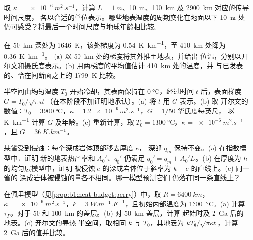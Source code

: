 \begin{exercise}[$\star\star$]\label{exo:b1:heat-budget:7}
取 $\kappa = \qty{e-6}{m^2.s^{-1}}$，计算
$L = \qty{1}{m}$、\qty{10}{m}、\qty{100}{km} 及 \qty{2900}{km} 对应的传导时间尺度，
各以合适的单位表示。哪些地表温度的周期变化在地面以下 \qty{10}{m} 处
仍可感受？将最后一个时间尺度与地球年龄相比较。
\end{exercise}

\begin{exercise}[$\star\star$]\label{exo:b1:heat-budget:8}
在 \qty{50}{km} 深处为 \qty{1646}{K}，该处梯度为
\qty{0.54}{K.km^{-1}}，至 \qty{410}{km} 处降为 \qty{0.36}{K.km^{-1}}。
(a) 以 \qty{50}{km} 处的梯度将其外推至地表，并给出
位温，分别以开尔文和摄氏度表示。(b) 用两梯度的平均值估计
\qty{410}{km} 处的温度，并
与已发表的、恰在间断面之上的 \qty{1799}{K} 比较。
\end{exercise}

\begin{exercise}[$\star\star$]\label{exo:b1:heat-budget:9}
半空间由均匀温度 $T_0$ 开始冷却，其表面保持在
$\qty{0}{\degreeCelsius}$，经过时间 $t$ 后，表面梯度 $G =
T_0/\sqrt{\pi\kappa t}$（在本阶段不加证明地承认）。(a) 将 $t$ 用 $G$ 表示。(b) 取
开尔文的数值：$T_0 = \qty{3900}{\degreeCelsius}$，$\kappa =
\qty{1.2e-6}{m^2.s^{-1}}$，$G = 1/50$ 华氏度每英尺，
以 \unit{K.km^{-1}} 计算 $G$ 及年龄。(c) 重新计算，取 $T_0 =
\qty{1300}{\degreeCelsius}$，$\kappa = \qty{e-6}{m^2.s^{-1}}$，且 $G =
\qty{36}{K.km^{-1}}$。
\end{exercise}

\begin{exercise}[$\star\star\star$]\label{exo:b1:heat-budget:10}
某省受到侵蚀：每个深成岩体顶部移去厚度 $e$，
深部 $q_m$ 保持不变。(a) 在指数模型中，证明
新的地表热产率和 $A_0'$、$q_0'$ 仍满足
$q_0' = q_m + A_0'D$。(b) 在厚度为 $h$ 的均匀层模型中，证明
被侵蚀 $e$ 的深成岩体位于斜率为 $h - e$ 的直线上。(c) 同一省的
深成岩体被侵蚀的量各不相同。哪一模型预测它们
仍落在同一条直线上？
\end{exercise}

\begin{exercise}[$\star\star\star$]\label{exo:b1:heat-budget:11}
在佩里模型（见\cref{prop:b1:heat-budget:perry}）中，取 $R = \qty{6400}{km}$，
$\kappa = \qty{e-6}{m^2.s^{-1}}$，$k = \qty{3}{W.m^{-1}.K^{-1}}$，且初始内部温度为
\qty{1300}{\degreeCelsius}。(a) 计算 $\tau_P$，对于
50 和 \qty{100}{km} 的盖层。(b) 对 \qty{50}{km} 盖层，计算
起始时及 \qty{2}{Ga} 后的地表。(c) 开尔文的导热
半空间，取相同 $k$ 与 $T_0$，其地表为
$kT_0/\sqrt{\pi\kappa t}$，计算 \qty{2}{Ga} 后的值并比较。
\end{exercise}

